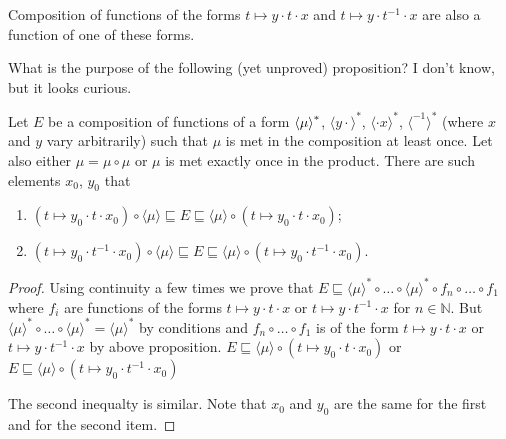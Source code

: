 \begin{obvious}
Composition of functions of the forms $t \mapsto y \cdot t \cdot x$ and $t
\mapsto y \cdot t^{- 1} \cdot x$ are also a function of one of these
forms.
\end{obvious}

What is the purpose of the following (yet unproved) proposition? I don't know, but it looks curious.

\begin{prop}
  Let $E$ be a composition of functions of a form
  $\left\langle \mu\right\rangle ^{\ast}$, $\langle y \cdot
  \rangle^{\ast}$, $\langle \cdot x \rangle^{\ast}$, $\langle^{- 1}
  \rangle^{\ast}$ (where $x$ and $y$ vary arbitrarily)
  such that $\mu$ is met in the composition at least once.
  Let also either $\mu = \mu \circ \mu$ or $\mu$ is met exactly once in the product.
  There are such elements $x_0$, $y_0$ that
  \begin{enumerate}
  \item $(t \mapsto y_0 \cdot t \cdot x_0) \circ \langle \mu \rangle
  \sqsubseteq E \sqsubseteq \langle \mu \rangle \circ (t \mapsto y_0 \cdot t
  \cdot x_0)$;
  
  \item  $(t \mapsto y_0 \cdot t^{- 1} \cdot x_0) \circ \langle \mu \rangle
  \sqsubseteq E \sqsubseteq \langle \mu \rangle \circ (t \mapsto y_0 \cdot
  t^{- 1} \cdot x_0)$.
  \end{enumerate}
\end{prop}

\begin{proof}
  Using continuity a few times we prove that $E \sqsubseteq \langle \mu
  \rangle^{\ast} \circ \ldots \circ \langle \mu \rangle^{\ast} \circ f_n \circ
  \ldots \circ f_1$ where $f_i$ are functions of the forms $t \mapsto y \cdot
  t \cdot x$ or $t \mapsto y \cdot t^{- 1} \cdot x$ for $n \in \mathbb{N}$.
  But $\langle \mu \rangle^{\ast} \circ \ldots \circ \langle \mu
  \rangle^{\ast} = \langle \mu \rangle^{\ast}$ by conditions and $f_n \circ
  \ldots \circ f_1$ is of the form $t \mapsto y \cdot t \cdot x$ or $t \mapsto
  y \cdot t^{- 1} \cdot x$ by above proposition. $E \sqsubseteq \langle \mu
  \rangle \circ (t \mapsto y_0 \cdot t \cdot x_0)$ or $E \sqsubseteq \langle
  \mu \rangle \circ (t \mapsto y_0 \cdot t^{- 1} \cdot x_0)$
  
  The second inequalty is similar. Note that $x_0$ and $y_0$ are the same for
  the first and for the second item.
\end{proof}

